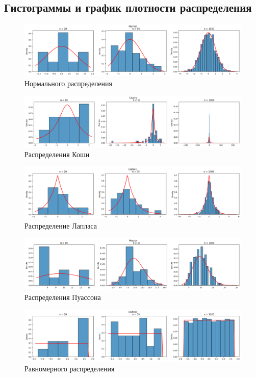 \subsection{Гистограммы и график плотности распределения}

\begin{figure}[H]
	\includegraphics[width=\textwidth]{tasks/1/res/normal.png}
	\caption{Нормального распределения} 
\end{figure}

\begin{figure}[H]
	\includegraphics[width=\textwidth]{tasks/1/res/cauchy.png}
	\caption{Распределения Коши} 
\end{figure}

\begin{figure}[H]
	\includegraphics[width=\textwidth]{tasks/1/res/laplace.png}
	\caption{Распределение Лапласа} 
\end{figure}

\begin{figure}[H]
	\includegraphics[width=\textwidth]{tasks/1/res/poisson.png}
	\caption{Распределения Пуассона} 
\end{figure}

\begin{figure}[H]
	\includegraphics[width=\textwidth]{tasks/1/res/uniform.png}
	\caption{Равномерного распределения} 
\end{figure}